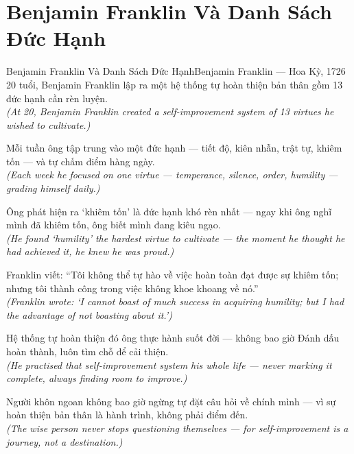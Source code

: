\section{Benjamin Franklin Và Danh Sách Đức Hạnh}
\begin{truyen}{Benjamin Franklin Và Danh Sách Đức Hạnh}{Benjamin Franklin --- Hoa Kỳ, 1726}
 20 tuổi, Benjamin Franklin lập ra một hệ thống tự hoàn thiện bản thân gồm 13 đức hạnh cần rèn luyện.\\[4pt]
\textit{(At 20, Benjamin Franklin created a self-improvement system of 13 virtues he wished to cultivate.)}

Mỗi tuần ông tập trung vào một đức hạnh --- tiết độ, kiên nhẫn, trật tự, khiêm tốn --- và tự chấm điểm hàng ngày.\\[4pt]
\textit{(Each week he focused on one virtue --- temperance, silence, order, humility --- grading himself daily.)}

Ông phát hiện ra `khiêm tốn' là đức hạnh khó rèn nhất --- ngay khi ông nghĩ mình đã khiêm tốn, ông biết mình đang kiêu ngạo.\\[4pt]
\textit{(He found `humility' the hardest virtue to cultivate --- the moment he thought he had achieved it, he knew he was proud.)}

Franklin viết: ``Tôi không thể tự hào về việc hoàn toàn đạt được sự khiêm tốn; nhưng tôi thành công trong việc không khoe khoang về nó.''\\[4pt]
\textit{(Franklin wrote: `I cannot boast of much success in acquiring humility; but I had the advantage of not boasting about it.')}

Hệ thống tự hoàn thiện đó ông thực hành suốt đời --- không bao giờ Đánh dấu hoàn thành, luôn tìm chỗ để cải thiện.\\[4pt]
\textit{(He practised that self-improvement system his whole life --- never marking it complete, always finding room to improve.)}

\end{truyen}
\begin{baihoc}
  Người khôn ngoan không bao giờ ngừng tự đặt câu hỏi về chính mình --- vì sự hoàn thiện bản thân là hành trình, không phải điểm đến.\\[4pt]
  \textit{(The wise person never stops questioning themselves --- for self-improvement is a journey, not a destination.)}
\end{baihoc}

